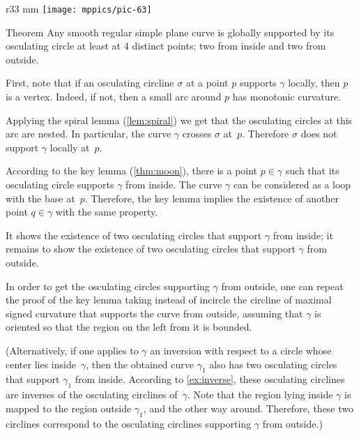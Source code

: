 {

\begin{wrapfigure}[6]{r}{33 mm}
\vskip-7mm
\centering
\texttt{[image: mppics/pic-63]}
\vskip0mm
\end{wrapfigure}

\begin{thm}{Theorem}\label{thm:4-vert-supporting}
Any smooth regular simple plane curve is globally supported by its osculating circle at least at 4 distinct points;
two from inside and two from outside.
\end{thm}


First, note that if an osculating circline $\sigma$ at a point $p$ supports $\gamma$ locally, then $p$ is a vertex.
Indeed, if not, then a small arc around $p$ has monotonic curvature.

}

Applying the spiral lemma (\ref{lem:spiral}) we get that the osculating circles at this arc are nested.
In particular, the curve $\gamma$ crosses $\sigma$ at~$p$. 
Therefore $\sigma$ does not support $\gamma$ locally at~$p$.
\qeds



According to the key lemma (\ref{thm:moon}), there is a point $p\in\gamma$ such that its osculating circle supports $\gamma$ from inside.
The curve $\gamma$ can be considered as a loop with the base at~$p$.
Therefore, the key lemma implies the existence of another point $q\in\gamma$ with the same property.

It shows the existence of two osculating circles that support $\gamma$ from inside;
it remains to show the existence of two osculating circles that support $\gamma$ from outside.

In order to get the osculating circles supporting $\gamma$ from outside, one can repeat the proof of the key lemma taking instead of incircle the circline of maximal signed curvature that supports the curve from outside, assuming that $\gamma$ is oriented so that the region on the left from it is bounded.%

(Alternatively, if one applies to $\gamma$ an inversion with respect to a circle whose center lies inside~$\gamma$, then the obtained curve $\gamma_1$ also has  two osculating circles that support $\gamma_1$ from inside.
According to \ref{ex:inverse}, these osculating circlines are inverses of the osculating circlines of~$\gamma$.
Note that the region lying inside $\gamma$ is mapped to the region outside $\gamma_1$, and the other way around.
Therefore, these two circlines correspond to the osculating circlines supporting $\gamma$ from outside.)
\qeds

